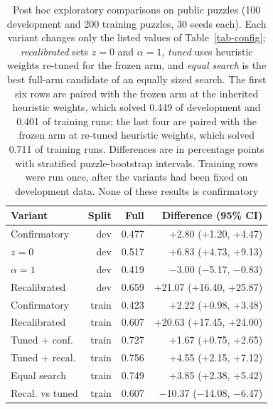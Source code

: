 \documentclass[pdflatex,sn-basic,iicol]{sn-jnl}
\begin{document}
\begin{table}[htbp]
\centering
\setlength{\tabcolsep}{4pt}
\caption{Post hoc exploratory comparisons on public puzzles (100 development and 200 training puzzles, 30 seeds each). Each variant changes only the listed values of Table~\ref{tab-config}; \emph{recalibrated} sets $z = 0$ and $\alpha = 1$, \emph{tuned} uses heuristic weights re-tuned for the frozen arm, and \emph{equal search} is the best full-arm candidate of an equally sized search. The first six rows are paired with the frozen arm at the inherited heuristic weights, which solved 0.449 of development and 0.401 of training runs; the last four are paired with the frozen arm at re-tuned heuristic weights, which solved 0.711 of training runs. Differences are in percentage points with stratified puzzle-bootstrap intervals. Training rows were run once, after the variants had been fixed on development data. None of these results is confirmatory}\label{tab-sweep}
\begin{tabular}{@{}lrrr@{}}
\toprule
Variant & Split & Full & Difference (95\% CI) \\
\midrule
Confirmatory & dev & 0.477 & +2.80 (+1.20, +4.47) \\
$z = 0$ & dev & 0.517 & +6.83 (+4.73, +9.13) \\
$\alpha = 1$ & dev & 0.419 & \(-\)3.00 (\(-\)5.17, \(-\)0.83) \\
Recalibrated & dev & 0.659 & +21.07 (+16.40, +25.87) \\
Confirmatory & train & 0.423 & +2.22 (+0.98, +3.48) \\
Recalibrated & train & 0.607 & +20.63 (+17.45, +24.00) \\
Tuned + conf. & train & 0.727 & +1.67 (+0.75, +2.65) \\
Tuned + recal. & train & 0.756 & +4.55 (+2.15, +7.12) \\
Equal search & train & 0.749 & +3.85 (+2.38, +5.42) \\
Recal. vs tuned & train & 0.607 & \(-\)10.37 (\(-\)14.08, \(-\)6.47) \\
\bottomrule
\end{tabular}
\end{table}
\end{document}
